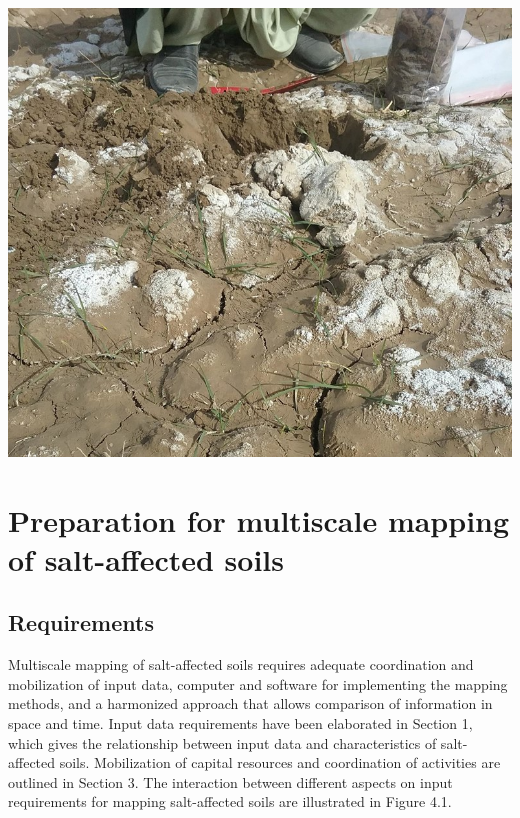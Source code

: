 \documentclass[
  10pt,
  b5paper,
]{book}
\begin{document}
\includegraphics{figures/images/Figure_sectionII.jpg}

\hypertarget{preparation-for-multiscale-mapping-of-salt-affected-soils}{%
\chapter{Preparation for multiscale mapping of salt-affected soils}\label{preparation-for-multiscale-mapping-of-salt-affected-soils}}

\hypertarget{requirements}{%
\section{Requirements}\label{requirements}}

Multiscale mapping of salt-affected soils requires adequate coordination and mobilization of input data, computer and software for implementing the mapping methods, and a harmonized approach that allows comparison of information in space and time. Input data requirements have been elaborated in Section 1, which gives the relationship between input data and characteristics of salt-affected soils. Mobilization of capital resources and coordination of activities are outlined in Section 3. The interaction between different aspects on input requirements for mapping salt-affected soils are illustrated in Figure 4.1.
\end{document}
